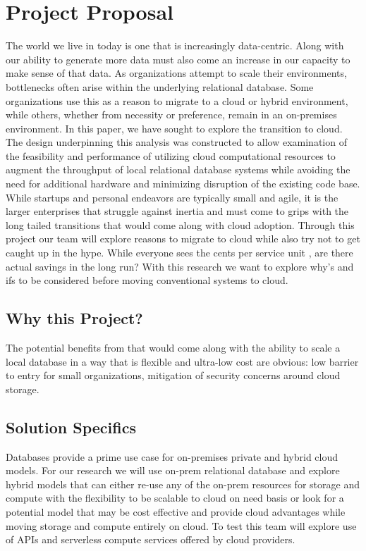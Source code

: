 \chapter*{Project Proposal}
\begin{flushleft}
    The world we live in today is one that is increasingly data-centric.  Along with our ability to generate more data must also come an increase in our capacity to make sense of that data.  As organizations attempt to scale their environments, bottlenecks often arise within the underlying relational database. Some organizations use this as a reason to migrate to a cloud or hybrid environment, while others, whether from necessity or preference, remain in an on-premises environment. In this paper, we have sought to explore the transition to cloud. The design underpinning this analysis was constructed to allow examination of the feasibility and performance of utilizing cloud computational resources to augment the throughput of local relational database systems while avoiding the need for additional hardware and minimizing disruption of the existing code base.  
    \\

    While startups and personal endeavors are typically small and agile, it is the larger enterprises that struggle against inertia and must come to grips with the long tailed transitions that would come along with cloud adoption. Through this project our team will explore reasons to migrate to cloud while also try not to get caught up in the hype. While everyone sees the cents per service unit , are there actual savings in the long run? With this research we want to explore why's and ifs to be considered before moving  conventional systems to cloud. 

\end{flushleft}
  
\pagebreak

\section*{Why this Project?}
The potential benefits from that would come along with the ability to scale a local database in a way that is flexible and ultra-low cost are obvious: low barrier to entry for small organizations, mitigation of security concerns around cloud storage.




\section*{Solution Specifics}
Databases provide a prime use case for on-premises private and hybrid cloud models. For our research we will use on-prem relational database and explore hybrid models that can either re-use any of the on-prem resources for storage and compute with the flexibility to be scalable to cloud on need basis or look for a potential model that may be cost effective and  provide cloud advantages while moving storage and compute entirely on cloud. To test this team will explore use of APIs and serverless compute services offered by cloud providers.